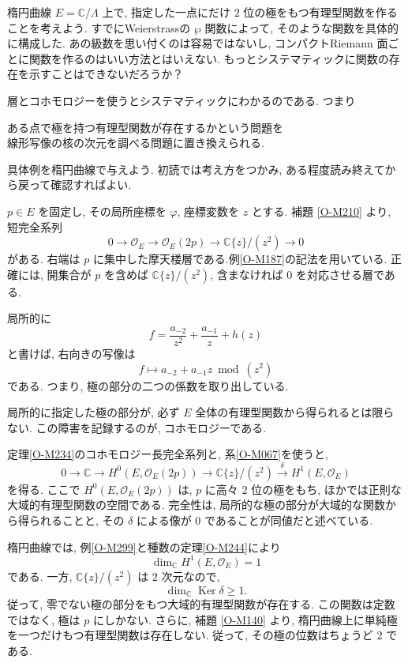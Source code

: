 \documentclass[dvipdfmx,a4paper,11pt]{article} %
\newcommand{\C}{\mathbb{C}}
\theoremstyle{definition}
\numberwithin{equation}{section}
\begin{document}
楕円曲線 $E=\C/\Lambda$ 上で, 指定した一点にだけ
$2$ 位の極をもつ有理型関数を作ることを考えよう.
すでにWeierstrassの $\wp$ 関数によって, 
そのような関数を具体的に構成した.
あの級数を思い付くのは容易ではないし, コンパクトRiemann 面ごとに関数を作るのはいい方法とはいえない. 
もっとシステマティックに関数の存在を示すことはできないだろうか？

層とコホモロジーを使うとシステマティックにわかるのである. つまり
\begin{tcolorbox}[mybox]
\begin{center}
ある点で極を持つ有理型関数が存在するかという問題を　\\
線形写像の核の次元を調べる問題に置き換えられる.
\end{center}
\end{tcolorbox}

具体例を楕円曲線で与えよう. 初読では考え方をつかみ, ある程度読み終えてから戻って確認すればよい.

$p\in E$ を固定し, その局所座標を $\varphi$, 座標変数を $z$ とする.
補題 \ref{O-M210} より, 短完全系列
\[
0\longrightarrow\mathcal O_E
\longrightarrow\mathcal O_E(2p)
\longrightarrow\C\{z\}/(z^2)
\longrightarrow0
\]
がある.
右端は $p$ に集中した摩天楼層である.例\ref{O-M187}の記法を用いている. 正確には, 開集合が $p$ を含めば $\C\{z\}/(z^2)$, 含まなければ $0$ を対応させる層である.

局所的に
\[
f=\frac{a_{-2}}{z^2}+\frac{a_{-1}}z+h(z)
\]
と書けば, 右向きの写像は
\[
f\longmapsto a_{-2}+a_{-1}z\bmod(z^2)
\]
である.
つまり, 極の部分の二つの係数を取り出している.

局所的に指定した極の部分が, 必ず $E$ 全体の有理型関数から得られるとは限らない.
この障害を記録するのが, コホモロジーである.

定理\ref{O-M234}のコホモロジー長完全系列と, 系\ref{O-M067}を使うと, 
\[
0\longrightarrow\C
\longrightarrow H^0(E,\mathcal O_E(2p))
\longrightarrow\C\{z\}/(z^2)
\xrightarrow{\delta}H^1(E,\mathcal O_E)
\]
を得る.
ここで $H^0(E,\mathcal O_E(2p))$ は, 
$p$ に高々 $2$ 位の極をもち, ほかでは正則な
大域的有理型関数の空間である.
完全性は, 局所的な極の部分が大域的な関数から得られることと, 
その $\delta$ による像が $0$ であることが同値だと述べている.

楕円曲線では, 例\ref{O-M299}と種数の定理\ref{O-M244}により
\[
\dim_\C H^1(E,\mathcal O_E)=1
\]
である.
一方, $\C\{z\}/(z^2)$ は $2$ 次元なので, 
\[
\dim_\C\operatorname{Ker}\delta\geq1.
\]
従って, 零でない極の部分をもつ大域的有理型関数が存在する.
この関数は定数ではなく, 極は $p$ にしかない.
さらに, 補題 \ref{O-M140} より, 
楕円曲線上に単純極を一つだけもつ有理型関数は存在しない.
従って, その極の位数はちょうど $2$ である.
\end{document}
